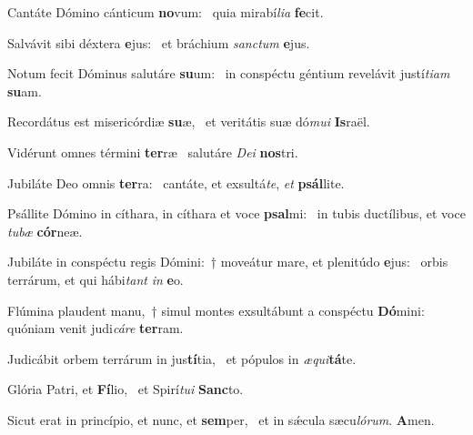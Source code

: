 \item Cantáte Dómino cánticum \textbf{no}vum:~\psstar{} quia mirabí\textit{lia} \textbf{fe}cit.
\item Salvávit sibi déxtera \textbf{e}jus:~\psstar{} et bráchium \textit{sanctum} \textbf{e}jus.
\item Notum fecit Dóminus salutáre \textbf{su}um:~\psstar{} in conspéctu géntium revelávit justí\textit{tiam} \textbf{su}am.
\item Recordátus est misericórdiæ \textbf{su}æ,~\psstar{} et veritátis suæ dó\textit{mui} \textbf{Is}raël.
\item Vidérunt omnes términi \textbf{ter}ræ~\psstar{} salutáre \textit{Dei} \textbf{nos}tri.
\item Jubiláte Deo omnis \textbf{ter}ra:~\psstar{} cantáte, et exsultá\textit{te}, \textit{et} \textbf{psál}lite.
\item Psállite Dómino in cíthara, in cíthara et voce \textbf{psal}mi:~\psstar{} in tubis ductílibus, et voce \textit{tubæ} \textbf{cór}neæ.
\item Jubiláte in conspéctu regis Dómini:~† moveátur mare, et plenitúdo \textbf{e}jus:~\psstar{} orbis terrárum, et qui hábi\textit{tant} \textit{in} \textbf{e}o.
\item Flúmina plaudent manu,~† simul montes exsultábunt a conspéctu \textbf{Dó}mini:~\psstar{} quóniam venit judi\textit{cáre} \textbf{ter}ram.
\item Judicábit orbem terrárum in jus\textbf{tí}tia,~\psstar{} et pópulos in \textit{æqui}\textbf{tá}te.
\item Glória Patri, et \textbf{Fí}lio,~\psstar{} et Spirí\textit{tui} \textbf{Sanc}to.
\item Sicut erat in princípio, et nunc, et \textbf{sem}per,~\psstar{} et in sǽcula sæcu\textit{lórum}. \textbf{A}men.
